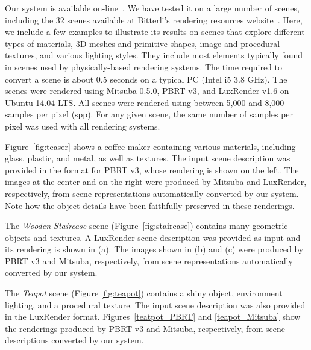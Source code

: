 Our system is available on-line~\cite{sceneConverter}.
We have tested it on a large number of scenes, including the 32 scenes available
at Bitterli's rendering resources website~\cite{resources16}. 
Here, we include a few examples to illustrate its results on scenes that explore different 
types of materials, 3D meshes and primitive shapes, image and 
procedural textures, and various lighting styles. They include most elements typically found in scenes used by physically-based rendering systems.  The time required to convert a scene is about 0.5 seconds on a typical PC (Intel i5 3.8 GHz).
% 
%
The scenes were rendered using Mitsuba 0.5.0, PBRT v3, and LuxRender v1.6 on 
Ubuntu 14.04 LTS. All scenes were rendered using between 5,000 and 8,000 samples per pixel (spp). For any given scene,
the same number of samples per pixel was used with all rendering systems. 

Figure~\ref{fig:teaser} shows a coffee maker containing various materials, including glass, plastic, and metal, as well as textures. The input scene description was provided in the format for PBRT v3, whose rendering is shown on the left. The images at the center and on the right were produced by Mitsuba and LuxRender, respectively, from scene representations automatically converted by our system. 
Note how the object details have been faithfully preserved in these renderings.

The \textit{Wooden Staircase} scene (Figure~\ref{fig:staircase}) contains many geometric objects and textures. 
A LuxRender scene description was provided as input and its rendering is shown in (a). The images shown in (b) and (c) were produced 
by PBRT v3 and Mitsuba, respectively, from scene representations automatically converted by our system. 

The \textit{Teapot} scene (Figure \ref{fig:teapot}) contains a shiny object, environment lighting, and a procedural texture. The input scene description was also provided in the LuxRender format. Figures~\ref{teatpot_PBRT} and \ref{teapot_Mitsuba} show the renderings produced by PBRT v3 and Mitsuba, respectively, from scene descriptions converted by our system.

